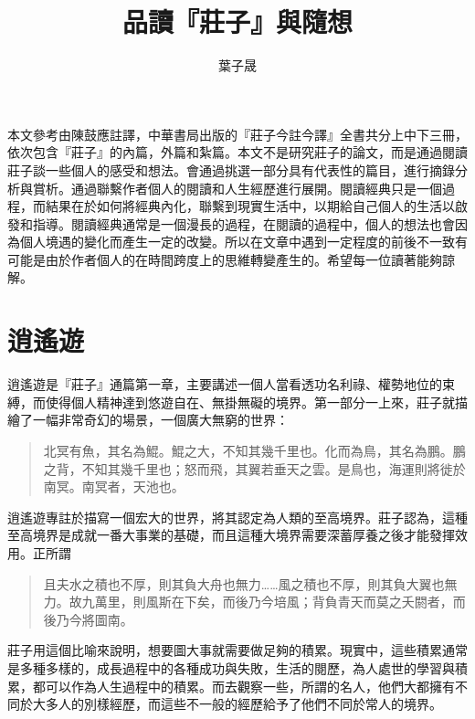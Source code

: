\documentclass[12pt,a4paper]{article}
\begin{document}
\begin{CJK*}{UTF8}{bsmi}
    
    \title{品讀『莊子』與隨想}
    \author{葉子晟}
    \date{}
    \maketitle
    
    \small
    本文參考由陳鼓應註譯，中華書局出版的『莊子今註今譯』全書共分上中下三冊，依次包含『莊子』的內篇，外篇和紮篇。本文不是研究莊子的論文，而是通過閱讀莊子談一些個人的感受和想法。會通過挑選一部分具有代表性的篇目，進行摘錄分析與賞析。通過聯繫作者個人的閱讀和人生經歷進行展開。閱讀經典只是一個過程，而結果在於如何將經典內化，聯繫到現實生活中，以期給自己個人的生活以啟發和指導。閱讀經典通常是一個漫長的過程，在閱讀的過程中，個人的想法也會因為個人境遇的變化而產生一定的改變。所以在文章中遇到一定程度的前後不一致有可能是由於作者個人的在時間跨度上的思維轉變產生的。希望每一位讀著能夠諒解。

    \normalsize

    \section{逍遙遊}
    逍遙遊是『莊子』通篇第一章，主要講述一個人當看透功名利祿、權勢地位的束縛，而使得個人精神達到悠遊自在、無掛無礙的境界。第一部分一上來，莊子就描繪了一幅非常奇幻的場景，一個廣大無窮的世界：
    \begin{quotation}
        北冥有魚，其名為鯤。鯤之大，不知其幾千里也。化而為鳥，其名為鵬。鵬之背，不知其幾千里也；怒而飛，其翼若垂天之雲。是鳥也，海運則將徙於南冥。南冥者，天池也。
    \end{quotation}
    逍遙遊專註於描寫一個宏大的世界，將其認定為人類的至高境界。莊子認為，這種至高境界是成就一番大事業的基礎，而且這種大境界需要深蓄厚養之後才能發揮效用。正所謂
    \begin{quotation}
        且夫水之積也不厚，則其負大舟也無力……風之積也不厚，則其負大翼也無力。故九萬里，則風斯在下矣，而後乃今培風；背負青天而莫之夭閼者，而後乃今將圖南。
    \end{quotation}
    莊子用這個比喻來說明，想要圖大事就需要做足夠的積累。現實中，這些積累通常是多種多樣的，成長過程中的各種成功與失敗，生活的閱歷，為人處世的學習與積累，都可以作為人生過程中的積累。而去觀察一些，所謂的名人，他們大都擁有不同於大多人的別樣經歷，而這些不一般的經歷給予了他們不同於常人的境界。


\end{CJK*}
\end{document}
